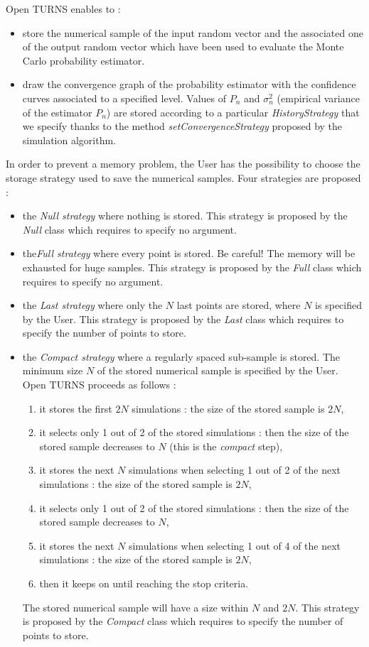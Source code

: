 Open TURNS enables to :
\begin{itemize}
\item store the numerical sample of the input random  vector and the associated one of the output random  vector which have been used to evaluate the Monte Carlo probability estimator.
\item draw the convergence graph of the probability estimator with the confidence curves associated to a specified level. Values of $P_n$ and $\sigma_n^2$ (empirical variance of the estimator $P_n$) are stored according to a particular {\itshape HistoryStrategy} that we specify thanks to the method {\itshape setConvergenceStrategy} proposed by the simulation algorithm.
\end{itemize}
In order to prevent a memory problem, the User has the possibility to choose the storage strategy used to save the numerical samples. Four strategies are proposed :
\begin{itemize}
\item the {\itshape Null strategy} where nothing is stored. This strategy is proposed by the {\itshape Null} class which requires to specify no argument.
\item the{\itshape  Full strategy} where every point is stored. Be careful! The memory will be exhausted for huge samples. This strategy is proposed by the {\itshape Full} class which requires to specify no argument.
\item the {\itshape Last strategy} where only the $N$ last points are stored, where $N$ is specified by the User. This strategy is proposed by the {\itshape Last} class which requires to specify the number of points to store.
\item the {\itshape Compact strategy} where a regularly spaced sub-sample is stored. The minimum size $N$ of the stored numerical sample is specified by the User.  Open TURNS proceeds as follows :
  \begin{enumerate}
  \item it stores the first $2N$ simulations : the size of the stored sample is $2N$,
  \item it selects only 1 out of 2 of the stored simulations : then the size of the stored sample decreases to $N$ (this is the {\itshape compact} step),
  \item it stores the next $N$ simulations when selecting 1 out of 2 of the next simulations : the size of the stored sample is $2N$,
  \item it selects only 1 out of 2 of the stored simulations : then the size of the stored sample decreases to $N$,
  \item it stores the next $N$ simulations when selecting 1 out of 4 of the next simulations : the size of the stored sample is $2N$,
  \item then it keeps on until  reaching the stop criteria.
  \end{enumerate}
  The stored numerical sample will have a size within $N$ and $2N$. This strategy is proposed by the {\itshape Compact} class which requires to specify the number of points to store.
\end{itemize}

